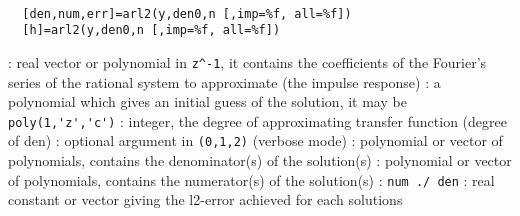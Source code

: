 \begin{mandesc}
   \\ %
\end{mandesc}
\begin{calling_sequence}
\begin{verbatim}
  [den,num,err]=arl2(y,den0,n [,imp=%f, all=%f])
  [h]=arl2(y,den0,n [,imp=%f, all=%f])
\end{verbatim}
\end{calling_sequence}
\begin{parameters}
  \begin{varlist}
    : real vector or polynomial in \verb!z^-1!, it contains the
    coefficients of the Fourier's series of the rational system to approximate
    (the impulse response) 
    : a polynomial which gives an initial guess of the solution, it
    may be \verb!poly(1,'z','c')!
    : integer, the degree of approximating transfer function (degree of den)
    : optional argument in \verb!(0,1,2)! (verbose mode)
    : polynomial or vector of polynomials, contains the
    denominator(s) of the solution(s)
    : polynomial or vector of polynomials, contains the numerator(s)
    of the solution(s)
    : \verb!num ./ den!
    : real constant or vector giving the l2-error achieved for each solutions
  \end{varlist}
\end{parameters}
